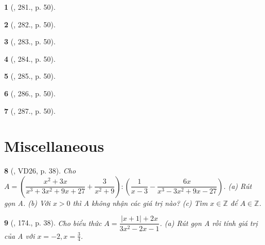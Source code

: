 \documentclass{article}
\newtheorem{baitoan}{}
\begin{document}
\begin{baitoan}[\cite{Binh_Toan_8_tap_1}, 281., p. 50]
	
\end{baitoan}

\begin{baitoan}[\cite{Binh_Toan_8_tap_1}, 282., p. 50]
	
\end{baitoan}

\begin{baitoan}[\cite{Binh_Toan_8_tap_1}, 283., p. 50]
	
\end{baitoan}

\begin{baitoan}[\cite{Binh_Toan_8_tap_1}, 284., p. 50]
	
\end{baitoan}

\begin{baitoan}[\cite{Binh_Toan_8_tap_1}, 285., p. 50]
	
\end{baitoan}

\begin{baitoan}[\cite{Binh_Toan_8_tap_1}, 286., p. 50]
	
\end{baitoan}

\begin{baitoan}[\cite{Binh_Toan_8_tap_1}, 287., p. 50]
	
\end{baitoan}


\section{Miscellaneous}

\begin{baitoan}[\cite{Tuyen_Toan_8}, VD26, p. 38]
	Cho $A = \left(\dfrac{x^2 + 3x}{x^3 + 3x^2 + 9x + 27} + \dfrac{3}{x^2 + 9}\right):\left(\dfrac{1}{x - 3} - \dfrac{6x}{x^3 - 3x^2 + 9x - 27}\right)$. (a) Rút gọn A. (b) Với $x > 0$ thì A không nhận các giá trị nào? (c) Tìm $x\in\mathbb{Z}$ để $A\in\mathbb{Z}$.
\end{baitoan}

\begin{baitoan}[\cite{Tuyen_Toan_8}, 174., p. 38]
	Cho biểu thức $A = \dfrac{|x + 1| + 2x}{3x^2 - 2x - 1}$. (a) Rút gọn A rồi tính giá trị của A với $x = -2,x = \frac{3}{4}$.
\end{baitoan}
\end{document}
